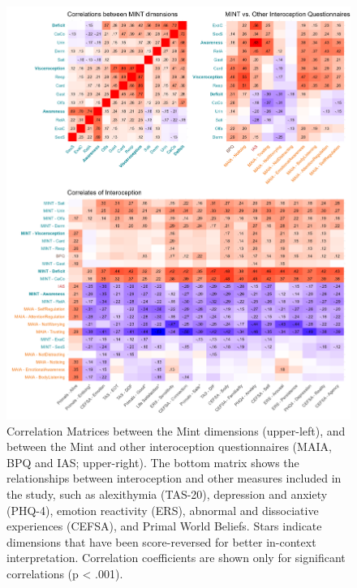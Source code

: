 \documentclass[
  jou,
  floatsintext,
  longtable,
  nolmodern,
  notxfonts,
  notimes,
  colorlinks=true,linkcolor=blue,citecolor=blue,urlcolor=blue]{apa7}
\begin{document}
\begin{figure}[!htbp]

{\caption{{Correlation Matrices between the Mint dimensions
(upper-left), and between the Mint and other interoception
questionnaires (MAIA, BPQ and IAS; upper-right). The bottom matrix shows
the relationships between interoception and other measures included in
the study, such as alexithymia (TAS-20), depression and anxiety (PHQ-4),
emotion reactivity (ERS), abnormal and dissociative experiences (CEFSA),
and Primal World Beliefs. Stars indicate dimensions that have been
score-reversed for better in-context interpretation. Correlation
coefficients are shown only for significant correlations (p \textless{}
.001).}{\label{fig-four}}}}

\begin{center}
\includegraphics[width=1\linewidth,height=\textheight,keepaspectratio]{../study2/analysis/figures/fig2.png}
\end{center}

\end{figure}
\end{document}
